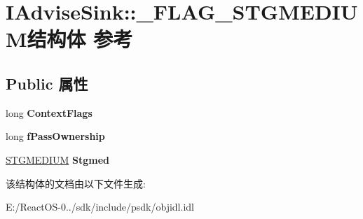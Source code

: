 \hypertarget{struct_i_advise_sink_1_1___f_l_a_g___s_t_g_m_e_d_i_u_m}{}\section{I\+Advise\+Sink\+:\+:\+\_\+\+F\+L\+A\+G\+\_\+\+S\+T\+G\+M\+E\+D\+I\+U\+M结构体 参考}
\label{struct_i_advise_sink_1_1___f_l_a_g___s_t_g_m_e_d_i_u_m}
\subsection*{Public 属性}
\begin{DoxyCompactItemize}
\item 
\mbox{\label{struct_i_advise_sink_1_1___f_l_a_g___s_t_g_m_e_d_i_u_m_ab27192d89a7a24fc6eb08fbc1d73ca93}} 
long {\bfseries Context\+Flags}
\item 
\mbox{\label{struct_i_advise_sink_1_1___f_l_a_g___s_t_g_m_e_d_i_u_m_afac42bf174c160135a0627285489cb12}} 
long {\bfseries f\+Pass\+Ownership}
\item 
\mbox{\label{struct_i_advise_sink_1_1___f_l_a_g___s_t_g_m_e_d_i_u_m_a854806f8c6f5de73af61f5ef7cfa8f4c}} 
\hyperlink{struct_i_advise_sink_1_1tag_s_t_g_m_e_d_i_u_m}{S\+T\+G\+M\+E\+D\+I\+UM} {\bfseries Stgmed}
\end{DoxyCompactItemize}


该结构体的文档由以下文件生成\+:\begin{DoxyCompactItemize}
\item 
E\+:/\+React\+O\+S-\/0../sdk/include/psdk/objidl.\+idl\end{DoxyCompactItemize}
